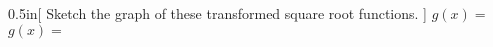 
\begin{my2Problems}[\normalsize]{0.5in}[%
    Sketch the graph of these transformed square root functions.
    ]
    {
        $ g(x) = $
    }
    {
        $ g(x) = $
    }
\end{my2Problems}
